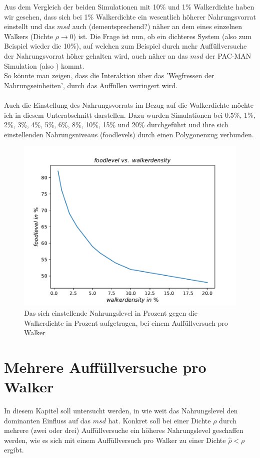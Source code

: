 \documentclass[a4paper, 12pt]{report}
\begin{document}
Aus dem Vergleich der beiden Simulationen mit 10\% und 1\% Walkerdichte haben wir gesehen, dass sich bei 1\% Walkerdichte ein wesentlich höherer Nahrungsvorrat einstellt und das $msd$ auch (dementsprechend?) näher an dem eines einzelnen Walkers (Dichte $\rho \rightarrow 0$) ist. Die Frage ist nun, ob ein dichteres System (also zum Beispiel wieder die 10\%), auf welchen zum Beispiel durch mehr Auffüllversuche der Nahrungsvorrat höher gehalten wird, auch näher an das $msd$ der PAC-MAN Simulation (also \cite{doi:10.1063/1.4999485}) kommt.
\\
So könnte man zeigen, dass die Interaktion über das 'Wegfressen der Nahrungseinheiten', durch das Auffüllen verringert wird.
\\
\\
Auch die Einstellung des Nahrungsvorrats im Bezug auf die Walkerdichte möchte ich in diesem Unterabschnitt darstellen. Dazu wurden Simulationen bei 0.5\%, 1\%, 2\%, 3\%, 4\%, 5\%, 6\%, 8\%, 10\%, 15\% und 20\% durchgeführt und ihre sich einstellenden Nahrungsniveaus (foodlevels) durch einen Polygonenzug verbunden.

\begin{figure}[H]
	\centering
	\includegraphics[scale=0.75]{flevel_vs_dens.pdf}
	\caption{Das sich einstellende Nahrungslevel in Prozent gegen die Walkerdichte in Prozent aufgetragen, bei einem Auffüllversuch pro Walker}
\end{figure}

\clearpage

\section{Mehrere Auffüllversuche pro Walker}
In diesem Kapitel soll untersucht werden, in wie weit das Nahrungslevel den dominanten Einfluss auf das $msd$ hat. Konkret soll bei einer Dichte $\rho$ durch mehrere (zwei oder drei) Auffüllversuche ein höheres Nahrungslevel geschaffen werden, wie es sich mit einem Auffüllversuch pro Walker zu einer Dichte $\hat{\rho}<\rho$ ergibt.
\end{document}
